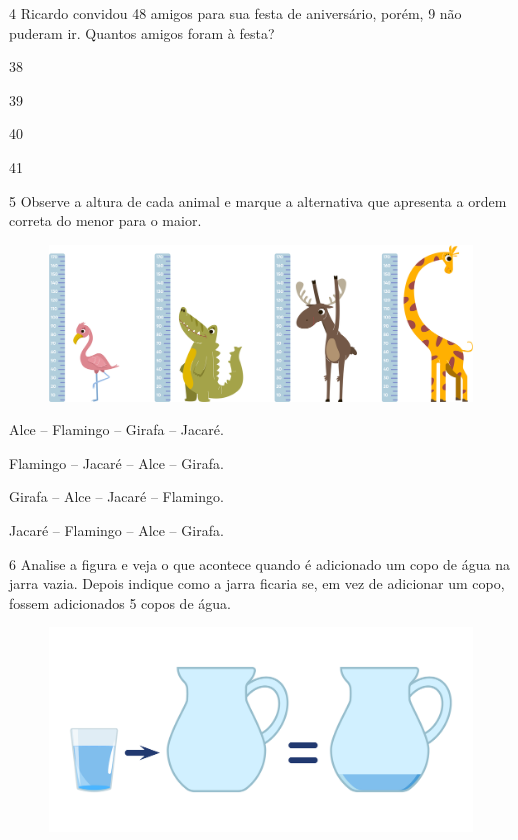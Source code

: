 \num{4} Ricardo convidou 48 amigos para sua festa de aniversário, porém, 9 não
puderam ir. Quantos amigos foram à festa?

\begin{escolha}[itemsep=-5pt]
\item 38

\item 39

\item 40

\item 41
\end{escolha}

\num{5} Observe a altura de cada animal e marque a alternativa que apresenta a
ordem correta do menor para o maior.

\begin{figure}[H]
\includegraphics[width=\textwidth]{./media/image139.png}
\end{figure}

\begin{escolha}[itemsep=-5pt]
\item Alce -- Flamingo -- Girafa -- Jacaré.

\item Flamingo -- Jacaré -- Alce -- Girafa.

\item Girafa -- Alce -- Jacaré -- Flamingo.

\item Jacaré -- Flamingo -- Alce -- Girafa.
\end{escolha}

\num{6} Analise a figura e veja o que acontece quando é adicionado um copo de
água na jarra vazia. Depois indique como a jarra ficaria se, em vez de
adicionar um copo, fossem adicionados 5 copos de água.

\begin{figure}[H]
\centering
\includegraphics[width=\textwidth]{./media/image140.png}
\end{figure}

